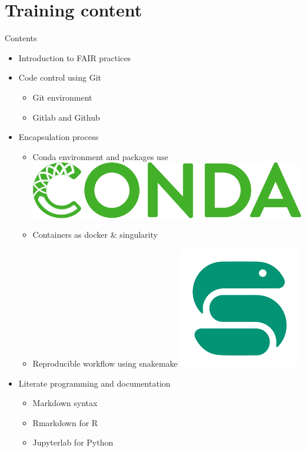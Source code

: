 \section{Training content}
\begin{frame}
\begin{block}{Contents}
\begin{itemize}
\item<1-> Introduction to FAIR practices
\item<2-> Code control using Git \faGit* 
	\begin{itemize}[<2->]
	\item Git environment
	\item Gitlab and Github \faGithub \faGitlab
	\end{itemize}
\item<3-> Encapsulation process
	\begin{itemize}[<3->]
	\item Conda environment and packages use \includegraphics[scale=0.07]{images/conda_logo.pdf}
	\item Containers as docker \& singularity \faDocker 
	\item Reproducible workflow using snakemake 	\includegraphics[scale=0.05]{images/snakemake_logo.png}
	\end{itemize}
\item<4-> Literate programming and documentation
	\begin{itemize}[<4->]
	\item Markdown syntax \faMarkdown
	\item Rmarkdown for R \faRProject 
	\item Jupyterlab for Python \faPython
	\end{itemize}
\end{itemize}
\end{block}
\end{frame}

